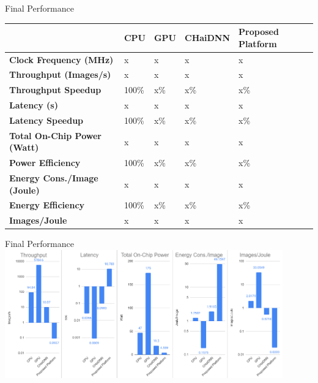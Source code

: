 \begin{frame}{Final Performance}
	\begin{table}[H]
		\centering
		\begin{tabular}{l|l|l|l|l}
			\toprule
			                                    & \textbf{CPU} & \textbf{GPU} & \textbf{CHaiDNN} & \textbf{Proposed Platform} \\
			\midrule
			\textbf{Clock Frequency (MHz)}      & x				& x				& x					& x							\\
			\textbf{Throughput (Images/s)}      & x				& x				& x					& x							\\
			\textbf{Throughput Speedup}         & 100\%			& x\%			& x\%				& x\%						\\
			\textbf{Latency (s)}                & x				& x				& x					& x							\\
			\textbf{Latency Speedup}            & 100\%			& x\%			& x\%				& x\%						\\
			\textbf{Total On-Chip Power (Watt)} & x				& x				& x					& x							\\
			\textbf{Power Efficiency}           & 100\%			& x\%			& x\%				& x\%						\\
			\textbf{Energy Cons./Image (Joule)} & x				& x				& x					& x							\\
			\textbf{Energy Efficiency}          & 100\%			& x\%			& x\%				& x\%						\\
			\textbf{Images/Joule}               & x				& x				& x					& x							\\
			\bottomrule
		\end{tabular}
	\end{table}
\end{frame}

\begin{frame}{Final Performance}
	\centering
	\includegraphics[width=0.9\textwidth]{../Images/Results/Final-Results-charts.png}\\
\end{frame}
